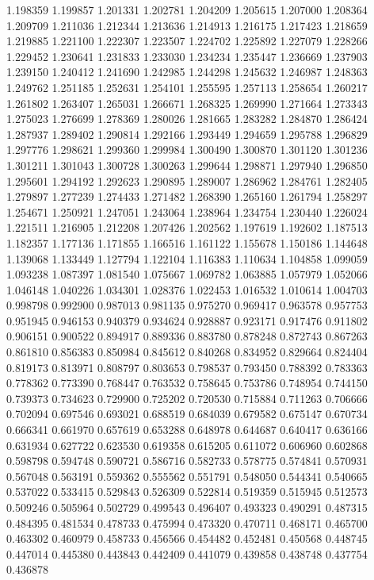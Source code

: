 1.198359
1.199857
1.201331
1.202781
1.204209
1.205615
1.207000
1.208364
1.209709
1.211036
1.212344
1.213636
1.214913
1.216175
1.217423
1.218659
1.219885
1.221100
1.222307
1.223507
1.224702
1.225892
1.227079
1.228266
1.229452
1.230641
1.231833
1.233030
1.234234
1.235447
1.236669
1.237903
1.239150
1.240412
1.241690
1.242985
1.244298
1.245632
1.246987
1.248363
1.249762
1.251185
1.252631
1.254101
1.255595
1.257113
1.258654
1.260217
1.261802
1.263407
1.265031
1.266671
1.268325
1.269990
1.271664
1.273343
1.275023
1.276699
1.278369
1.280026
1.281665
1.283282
1.284870
1.286424
1.287937
1.289402
1.290814
1.292166
1.293449
1.294659
1.295788
1.296829
1.297776
1.298621
1.299360
1.299984
1.300490
1.300870
1.301120
1.301236
1.301211
1.301043
1.300728
1.300263
1.299644
1.298871
1.297940
1.296850
1.295601
1.294192
1.292623
1.290895
1.289007
1.286962
1.284761
1.282405
1.279897
1.277239
1.274433
1.271482
1.268390
1.265160
1.261794
1.258297
1.254671
1.250921
1.247051
1.243064
1.238964
1.234754
1.230440
1.226024
1.221511
1.216905
1.212208
1.207426
1.202562
1.197619
1.192602
1.187513
1.182357
1.177136
1.171855
1.166516
1.161122
1.155678
1.150186
1.144648
1.139068
1.133449
1.127794
1.122104
1.116383
1.110634
1.104858
1.099059
1.093238
1.087397
1.081540
1.075667
1.069782
1.063885
1.057979
1.052066
1.046148
1.040226
1.034301
1.028376
1.022453
1.016532
1.010614
1.004703
0.998798
0.992900
0.987013
0.981135
0.975270
0.969417
0.963578
0.957753
0.951945
0.946153
0.940379
0.934624
0.928887
0.923171
0.917476
0.911802
0.906151
0.900522
0.894917
0.889336
0.883780
0.878248
0.872743
0.867263
0.861810
0.856383
0.850984
0.845612
0.840268
0.834952
0.829664
0.824404
0.819173
0.813971
0.808797
0.803653
0.798537
0.793450
0.788392
0.783363
0.778362
0.773390
0.768447
0.763532
0.758645
0.753786
0.748954
0.744150
0.739373
0.734623
0.729900
0.725202
0.720530
0.715884
0.711263
0.706666
0.702094
0.697546
0.693021
0.688519
0.684039
0.679582
0.675147
0.670734
0.666341
0.661970
0.657619
0.653288
0.648978
0.644687
0.640417
0.636166
0.631934
0.627722
0.623530
0.619358
0.615205
0.611072
0.606960
0.602868
0.598798
0.594748
0.590721
0.586716
0.582733
0.578775
0.574841
0.570931
0.567048
0.563191
0.559362
0.555562
0.551791
0.548050
0.544341
0.540665
0.537022
0.533415
0.529843
0.526309
0.522814
0.519359
0.515945
0.512573
0.509246
0.505964
0.502729
0.499543
0.496407
0.493323
0.490291
0.487315
0.484395
0.481534
0.478733
0.475994
0.473320
0.470711
0.468171
0.465700
0.463302
0.460979
0.458733
0.456566
0.454482
0.452481
0.450568
0.448745
0.447014
0.445380
0.443843
0.442409
0.441079
0.439858
0.438748
0.437754
0.436878
